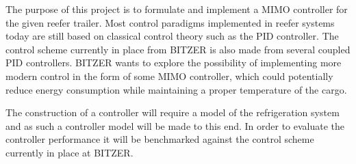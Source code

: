 The purpose of this project is to formulate and implement a MIMO controller for the given reefer trailer. Most control paradigms implemented in reefer systems today are still based on classical control theory such as the PID controller. The control scheme currently in place from BITZER is also made from several coupled PID controllers. BITZER wants to explore the possibility of implementing more modern control in the form of some MIMO controller, which could potentially reduce energy consumption while maintaining a proper temperature of the cargo.

The construction of a controller will require a model of the refrigeration system and as such a controller model will be made to this end. In order to evaluate the controller performance it will be benchmarked against the control scheme currently in place at BITZER.